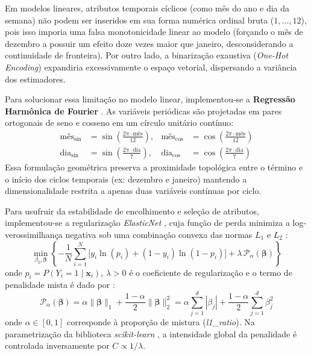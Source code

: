 \documentclass[conference]{IEEEtran}
\begin{document}
Em modelos lineares, atributos temporais cíclicos (como mês do ano e dia da semana) não podem ser inseridos em sua forma numérica ordinal bruta ($1, \dots, 12$), pois isso imporia uma falsa monotonicidade linear ao modelo (forçando o mês de dezembro a possuir um efeito doze vezes maior que janeiro, desconsiderando a continuidade de fronteira). Por outro lado, a binarização exaustiva (\textit{One-Hot Encoding}) expandiria excessivamente o espaço vetorial, dispersando a variância dos estimadores.

Para solucionar essa limitação no modelo linear, implementou-se a \textbf{Regressão Harmônica de Fourier} \cite{hyndman2021}. As variáveis periódicas são projetadas em pares ortogonais de seno e cosseno em um círculo unitário contínuo:
\begin{align}
\text{mês}_{\sin} &= \sin\left(\frac{2\pi \cdot \text{mês}}{12}\right), & \text{mês}_{\cos} &= \cos\left(\frac{2\pi \cdot \text{mês}}{12}\right) \label{eq:fourier_mes} \\
\text{dia}_{\sin} &= \sin\left(\frac{2\pi \cdot \text{dia}}{7}\right), & \text{dia}_{\cos} &= \cos\left(\frac{2\pi \cdot \text{dia}}{7}\right) \label{eq:fourier_dia}
\end{align}
Essa formulação geométrica preserva a proximidade topológica entre o término e o início dos ciclos temporais (ex: dezembro e janeiro) mantendo a dimensionalidade restrita a apenas duas variáveis contínuas por ciclo.

Para usufruir da estabilidade de encolhimento e seleção de atributos, implementou-se a regularização \textit{ElasticNet} \cite{zou2005}, cuja função de perda minimiza a log-verossimilhança negativa sob uma combinação convexa das normas $L_1$ e $L_2$ \cite{tibshirani1996, izbicki2020}:
\begin{equation}
\min_{\beta_0, \boldsymbol{\beta}} \left\{ -\frac{1}{N} \sum_{i=1}^N \Big[ y_i \ln(p_i) + (1 - y_i) \ln(1 - p_i) \Big] + \lambda \, \mathcal{P}_\alpha(\boldsymbol{\beta}) \right\}
\label{eq:elasticnet}
\end{equation}
onde $p_i = P(Y_i=1 \mid \mathbf{x}_i)$, $\lambda > 0$ é o coeficiente de regularização e o termo de penalidade mista é dado por \cite{zou2005}:
\begin{equation}
\mathcal{P}_\alpha(\boldsymbol{\beta}) = \alpha \|\boldsymbol{\beta}\|_1 + \frac{1 - \alpha}{2} \|\boldsymbol{\beta}\|_2^2 = \alpha \sum_{j=1}^d |\beta_j| + \frac{1 - \alpha}{2} \sum_{j=1}^d \beta_j^2
\label{eq:penalty_mix}
\end{equation}
onde $\alpha \in [0, 1]$ corresponde à proporção de mistura (\textit{l1\_ratio}). Na parametrização da biblioteca \textit{scikit-learn} \cite{pedregosa2011}, a intensidade global da penalidade é controlada inversamente por $C \propto 1/\lambda$.
\end{document}

